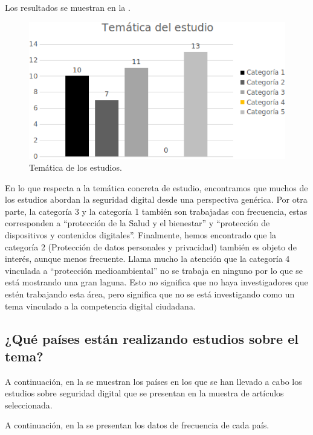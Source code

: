 \documentclass[spanish]{textolivre}
\begin{document}
Los resultados se muestran en la .

\begin{figure}[h!]
\centering
\begin{minipage}{0.65\textwidth}
\includegraphics[width=\textwidth]{Fig5.png}
\caption{Temática de los estudios.}
\label{fig5}
\end{minipage}
\end{figure}

En lo que respecta a la temática concreta de estudio, encontramos que muchos de los estudios abordan la seguridad digital desde una perspectiva genérica. Por otra parte, la categoría 3 y la categoría 1 también son trabajadas con frecuencia, estas corresponden a “protección de la Salud y el bienestar” y “protección de dispositivos y contenidos digitales”. Finalmente, hemos encontrado que la categoría 2 (Protección de datos personales y privacidad) también es objeto de interés, aunque menos frecuente. Llama mucho la atención que la categoría 4 vinculada a “protección medioambiental” no se trabaja en ninguno por lo que se está mostrando una gran laguna. Esto no significa que no haya investigadores que estén trabajando esta área, pero significa que no se está investigando como un tema vinculado a la competencia digital ciudadana.

\subsection{¿Qué países están realizando estudios sobre el tema?}\label{sec-organizacao}
A continuación, en la  se muestran los países en los que se han llevado a cabo los estudios sobre seguridad digital que se presentan en la muestra de artículos seleccionada.

A continuación, en la  se presentan los datos de frecuencia de cada país.
\end{document}
